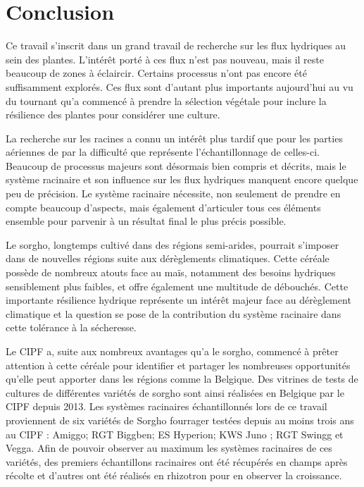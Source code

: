 \section{Conclusion}

Ce travail s'inscrit dans un grand travail de recherche sur les flux hydriques au sein des plantes.
L'intérêt porté à ces flux n'est pas nouveau, mais il reste beaucoup de zones à éclaircir.
Certains processus n'ont pas encore été suffisamment explorés.
Ces flux sont d'autant plus importants aujourd'hui au vu du tournant qu'a commencé à prendre la sélection végétale pour inclure la résilience des plantes pour considérer une culture.
\newline

La recherche sur les racines a connu un intérêt plus tardif que pour les parties aériennes de par la difficulté que représente l'échantillonnage de celles-ci.
Beaucoup de processus majeurs sont désormais bien compris et décrits, mais le système racinaire et son influence sur les flux hydriques manquent encore quelque peu de précision.
Le système racinaire nécessite, non seulement de prendre en compte beaucoup d'aspects, mais également d'articuler tous ces éléments ensemble pour parvenir à un résultat final le plus précis possible.
\newline

Le sorgho, longtemps cultivé dans des régions semi-arides, pourrait s'imposer dans de nouvelles régions suite aux dérèglements climatiques.
Cette céréale possède de nombreux atouts face au maïs, notamment des besoins hydriques sensiblement plus faibles, et offre également une multitude de débouchés.
Cette importante résilience hydrique représente un intérêt majeur face au dérèglement climatique et la question se pose de la contribution du système racinaire dans cette tolérance à la sécheresse.
\newline

Le CIPF a, suite aux nombreux avantages qu'a le sorgho, commencé à prêter attention à cette céréale pour identifier et partager les nombreuses opportunités qu'elle peut apporter dans les régions comme la Belgique.
Des vitrines de tests de cultures de différentes variétés de sorgho sont ainsi réalisées en Belgique par le CIPF depuis 2013.
Les systèmes racinaires échantillonnés lors de ce travail proviennent de six variétés de Sorgho fourrager testées depuis au moins trois ans au CIPF : Amiggo; RGT Biggben; ES Hyperion; KWS Juno ; RGT Swingg et Vegga.
Afin de pouvoir observer au maximum les systèmes racinaires de ces variétés, des premiers échantillons racinaires ont été récupérés en champs après récolte et d'autres ont été réalisés en rhizotron pour en observer la croissance.
\newline

